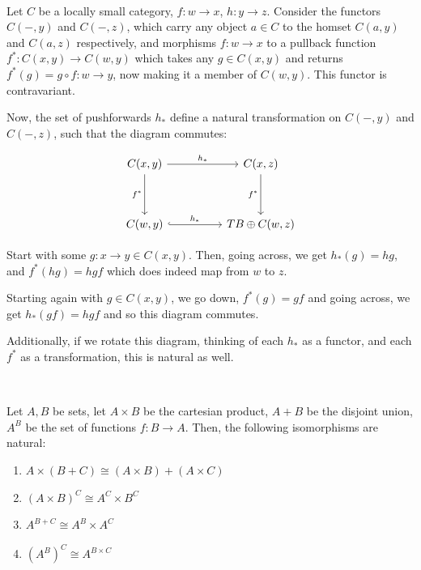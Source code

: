 \documentclass{article}
\begin{document}
\begin{example}
\

Let $C$ be a locally small category, $f: w \to x$, $h: y \to z$. Consider the functors $C(-, y)$ and $C(-,z)$, which carry any object $a \in C$ to the homset $C(a,y)$ and $C(a,z)$ respectively, and morphisms $f: w \to x$ to a pullback function $f^*: C(x,y) \to C(w,y)$ which takes any $g \in C(x,y)$ and returns $f^*(g) = g \circ f: w \to y$, now making it a member of $C(w,y)$. This functor is contravariant.

Now, the set of pushforwards $h_*$ define a natural transformation on $C(-,y)$ and $C(-,z)$, such that the diagram commutes:

\[\begin{tikzcd}
	C(x,y) && C(x,z) \\
    \\
    C(w,y) && TB \oplus C(w,z)
    \arrow[, from=1-1, to=1-3, "h_*"]
    \arrow[hook, from=3-1, to=3-3, "h_*"]
    \arrow[from=1-1, to=3-1, "f^*"']
    \arrow[from=1-3, to=3-3, "f^*"']
\end{tikzcd}\]

Start with some $g: x \to y \in C(x,y)$. Then, going across, we get $h_*(g) = hg$, and $f^*(hg) = hgf$ which does indeed map from $w$ to $z$.

Starting again with $g \in C(x,y)$, we go down, $f^*(g) = gf$ and going across, we get $h_*(gf) = hgf$ and so this diagram commutes.

Additionally, if we rotate this diagram, thinking of each $h_*$ as a functor, and each $f^*$ as a transformation, this is natural as well.
\end{example}
\begin{exercise}
\

Let $A,B$ be sets, let $A \times B$ be the cartesian product, $A + B$ be the disjoint union, $A^B$ be the set of functions $f:B \to A$. Then, the following isomorphisms are natural:

\begin{enumerate}
    \item $A \times (B + C) \cong (A \times B) + (A \times C)$
    \item $(A \times B)^C \cong A^C \times B^C$
    \item $A^{B+C} \cong A^B \times A^C$
    \item $(A^B)^C \cong A^{B \times C}$
\end{enumerate}
\end{exercise}
\end{document}
